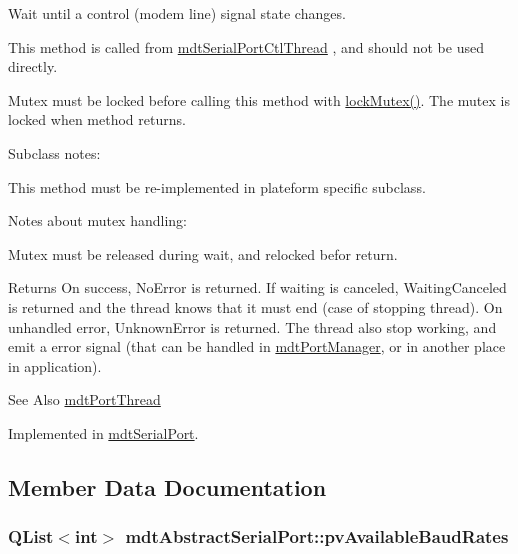 Wait until a control (modem line) signal state changes. 

This method is called from \hyperlink{classmdt_serial_port_ctl_thread}{mdt\-Serial\-Port\-Ctl\-Thread} , and should not be used directly.\par
 Mutex must be locked before calling this method with \hyperlink{classmdt_abstract_port_a6bf2ecdcf894da3929a22eb8793a9fe3}{lock\-Mutex()}. The mutex is locked when method returns.

Subclass notes\-:\par
 This method must be re-\/implemented in plateform specific subclass.\par
 Notes about mutex handling\-:
\begin{DoxyItemize}
\item Mutex must be released during wait, and relocked befor return.
\end{DoxyItemize}

\begin{DoxyReturn}{Returns}
On success, No\-Error is returned. If waiting is canceled, Waiting\-Canceled is returned and the thread knows that it must end (case of stopping thread). On unhandled error, Unknown\-Error is returned. The thread also stop working, and emit a error signal (that can be handled in \hyperlink{classmdt_port_manager}{mdt\-Port\-Manager}, or in another place in application).
\end{DoxyReturn}
\begin{DoxySeeAlso}{See Also}
\hyperlink{classmdt_port_thread}{mdt\-Port\-Thread} 
\end{DoxySeeAlso}


Implemented in \hyperlink{classmdt_serial_port_a9d1402c229401343a3bf66eeda4fe9da}{mdt\-Serial\-Port}.



\subsection{Member Data Documentation}
\hypertarget{classmdt_abstract_serial_port_aa7ac0cd1058d0b6b322c41479b8ee631}{
\subsubsection[{pv\-Available\-Baud\-Rates}]{\setlength{\rightskip}{0pt plus 5cm}Q\-List$<$int$>$ mdt\-Abstract\-Serial\-Port\-::pv\-Available\-Baud\-Rates\hspace{0.3cm}{\ttfamily [protected]}}}\label{classmdt_abstract_serial_port_aa7ac0cd1058d0b6b322c41479b8ee631}


